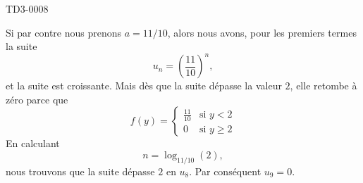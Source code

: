 \begin{corrige}{TD3-0008}
\begin{enumerate}
			Si par contre nous prenons $a=11/10$, alors nous avons, pour les premiers termes la suite
			\begin{equation}
				u_n=\left( \frac{ 11 }{ 10 } \right)^n,
			\end{equation}
			et la suite est croissante. Mais dès que la suite dépasse la valeur $2$, elle retombe à zéro parce que 
			\begin{equation}
				f(y)=\begin{cases}
					\frac{ 11 }{ 10 }	&	\text{si }y<2\\
					0	&	 \text{si }y\geq 2
				\end{cases}
			\end{equation}
			En calculant
			\begin{equation}
				n=\log_{11/10}(2),
			\end{equation}
			nous trouvons que la suite dépasse $2$ en $u_8$. Par conséquent $u_9=0$.

	\end{enumerate}

\end{corrige}
